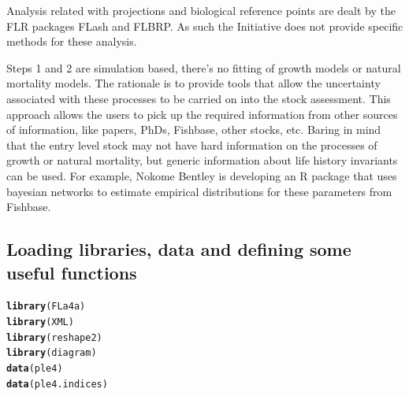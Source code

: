 \documentclass[a4paper,english,10pt]{article}\usepackage[]{graphicx}\usepackage[]{color}
\makeatletter
\newcommand{\hlstd}[1]{\textcolor[rgb]{0.345,0.345,0.345}{#1}}%
\newcommand{\hlkwd}[1]{\textcolor[rgb]{0.737,0.353,0.396}{\textbf{#1}}}%
\newenvironment{kframe}{%
 \def\at@end@of@kframe{}%
 \ifinner\ifhmode%
  \def\at@end@of@kframe{\end{minipage}}%
  \begin{minipage}{\columnwidth}%
 \fi\fi%
 \def\FrameCommand##1{\hskip\@totalleftmargin \hskip-\fboxsep
 \colorbox{shadecolor}{##1}\hskip-\fboxsep
     \hskip-\linewidth \hskip-\@totalleftmargin \hskip\columnwidth}%
 \MakeFramed {\advance\hsize-\width
   \@totalleftmargin\z@ \linewidth\hsize
   \@setminipage}}%
 {\par\unskip\endMakeFramed%
 \at@end@of@kframe}
\newenvironment{knitrout}{}{} %
\makeatother
\begin{document}
Analysis related with projections and biological reference points are dealt by the FLR packages FLash and FLBRP. As such the Initiative does not provide specific methods for these analysis.

Steps 1 and 2 are simulation based, there's no fitting of growth models or natural mortality models. The rationale is to provide tools that allow the uncertainty associated with these processes to be carried on into the stock assessment. This approach allows the users to pick up the required information from other sources of information, like papers, PhDs, Fishbase, other stocks, etc. Baring in mind that the entry level stock may not have hard information on the processes of growth or natural mortality, but generic information about life history invariants can be used. For example, Nokome Bentley is developing an R package that uses bayesian networks to estimate empirical distributions for these parameters from Fishbase.

\subsection{Loading libraries, data and defining some useful functions}

\begin{knitrout}
\color{fgcolor}\begin{kframe}
\begin{alltt}
\hlkwd{library}\hlstd{(FLa4a)}
\hlkwd{library}\hlstd{(XML)}
\hlkwd{library}\hlstd{(reshape2)}
\hlkwd{library}\hlstd{(diagram)}
\hlkwd{data}\hlstd{(ple4)}
\hlkwd{data}\hlstd{(ple4.indices)}
\end{alltt}
\end{kframe}
\end{knitrout}
\end{document}
